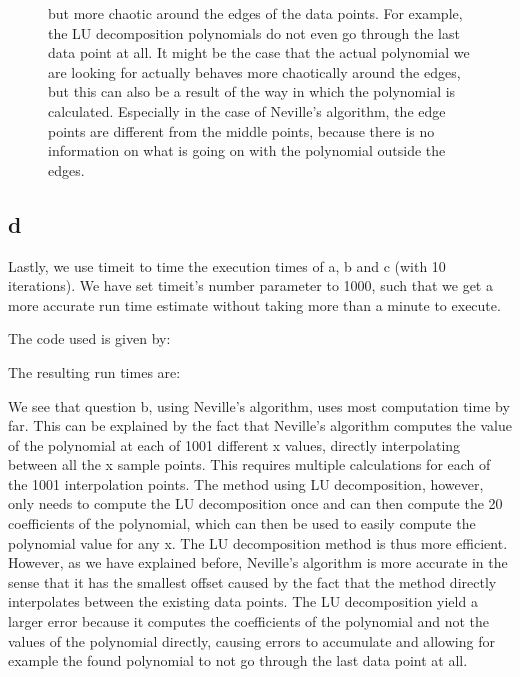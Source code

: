 \begin{figure}[h!]
{    but more chaotic around the edges of the data points. For example, the LU decomposition polynomials do not even go through the last data point at all. It might be the case that the actual polynomial we are looking for actually behaves more chaotically around the edges,
    but this can also be a result of the way in which the polynomial is calculated. Especially in the case of Neville's algorithm, the edge points are different from the middle points, because there is no information on what is going on with the polynomial outside the edges.}
    \label{fig:2c}
\end{figure}

\subsection{d}

Lastly, we use timeit to time the execution times of a, b and c (with 10 iterations).
We have set timeit's number parameter to 1000, such that we get a more accurate run time estimate without taking more than a minute to execute.

The code used is given by:


The resulting run times are:


We see that question b, using Neville's algorithm, uses most computation time by far. This can be explained by the fact that Neville's algorithm computes the value of the polynomial at each of 1001 different x values, directly interpolating between all the x sample points.
This requires multiple calculations for each of the 1001 interpolation points. The method using LU decomposition, however, only needs to compute the LU decomposition once and can then compute the 20 coefficients of the polynomial, which can then be used to easily compute the polynomial value for any x.
The LU decomposition method is thus more efficient. However, as we have explained before, Neville's algorithm is more accurate in the sense that it has the smallest offset caused by the fact that the method directly interpolates between the existing data points.
The LU decomposition yield a larger error because it computes the coefficients of the polynomial and not the values of the polynomial directly, causing errors to accumulate and allowing for example the found polynomial to not go through the last data point at all.
